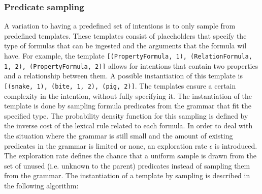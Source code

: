 \documentclass[a4paper]{article}
\begin{document}
\subsubsection{Predicate sampling}
\label{sec:predicate_sampling}
A variation to having a predefined set of intentions is to only sample from predefined templates. These templates consist of placeholders that specify the type of formulas that can be ingested and the arguments that the formula wil have. For example, the template \verb|[(PropertyFormula, 1), (RelationFormula, 1, 2), (PropertyFormula, 2)]| allows for intentions that contain two properties and a relationship between them. A possible instantiation of this template is \verb|[(snake, 1), (bite, 1, 2), (pig, 2)]|. The templates ensure a certain complexity in the intention, without fully specifying it. The instantiation of the template is done by sampling formula predicates from the grammar that fit the specified type. The probability density function for this sampling is defined by the inverse cost of the lexical rule related to each formula. In order to deal with the situation where the grammar is still small and the amount of existing predicates in the grammar is limited or none, an exploration rate $\epsilon$ is introduced. The exploration rate defines the chance that a uniform sample is drawn from the set of unused (i.e. unknown to the parent) predicates instead of sampling them from the grammar. The instantiation of a template by sampling is described in the following algorithm:
\end{document}
